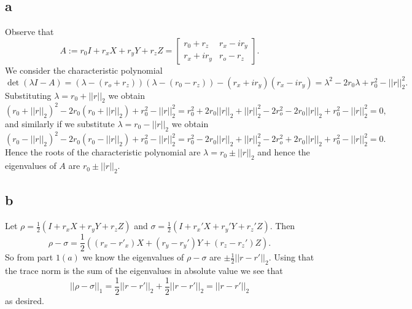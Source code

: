 \documentclass[letterpaper,12pt,oneside,onecolumn]{article}
\begin{document}
\section{}
\subsection{a}
Observe that 
$$A:= r_0I + r_xX + r_yY + r_zZ = \begin{bmatrix}
r_0 + r_z & r_x - ir_y \\ r_x + ir_y & r_o -r_z
\end{bmatrix}.$$
We consider the characteristic polynomial
$$\det(\lambda I - A) = (\lambda - (r_o+r_z))(\lambda - (r_0 -r_z)) -(r_x+ir_y)(r_x-ir_y) = \lambda^2 - 2r_0\lambda +r_0^2 - ||r||_2^2.$$
Substituting $\lambda = r_0 + ||r||_2$ we obtain
$$(r_0 + ||r||_2)^2 - 2r_0(r_0 + ||r||_2) + r_0^2 - ||r||_2^2 = r_0^2 + 2r_0||r||_2 + ||r||_2^2 - 2r_o^2 -2r_0||r||_2 +r_0^2 - ||r||_2^2 = 0,$$
and similarly if we substitute $\lambda=r_0 - ||r||_2$ we obtain
$$(r_0 - ||r||_2)^2 - 2r_0(r_0 -||r||_2) + r_0^2 - ||r||_2^2 = r_0^2 - 2r_0||r||_2 + ||r||_2^2 - 2r_o^2 +2r_0||r||_2 +r_0^2 - ||r||_2^2 = 0.$$
Hence the roots of the characteristic polynomial are $\lambda = r_0 \pm ||r||_2$ and hence the eigenvalues of $A$ are  $r_0 \pm ||r||_2$.
\subsection{b}
Let $\rho = \frac{1}{2}(I + r_xX + r_yY + r_zZ)$ and $\sigma =  \frac{1}{2}(I + r_x'X + r_y'Y + r_z'Z)$. Then
$$\rho-\sigma =\frac{1}{2}( (r_x-r'_x)X + (r_y-r_y')Y + (r_z-r_z')Z).$$
So from part $1(a)$ we know the eigenvalues of $\rho-\sigma$ are $\pm \frac{1}{2}||r - r'||_2.$
Using that the trace norm is the sum of the eigenvalues in absolute value we see that
$$||\rho-\sigma||_1 = \frac{1}{2}||r-r'||_2 + \frac{1}{2}||r-r'||_2 = ||r-r'||_2$$
as desired.
\end{document}
